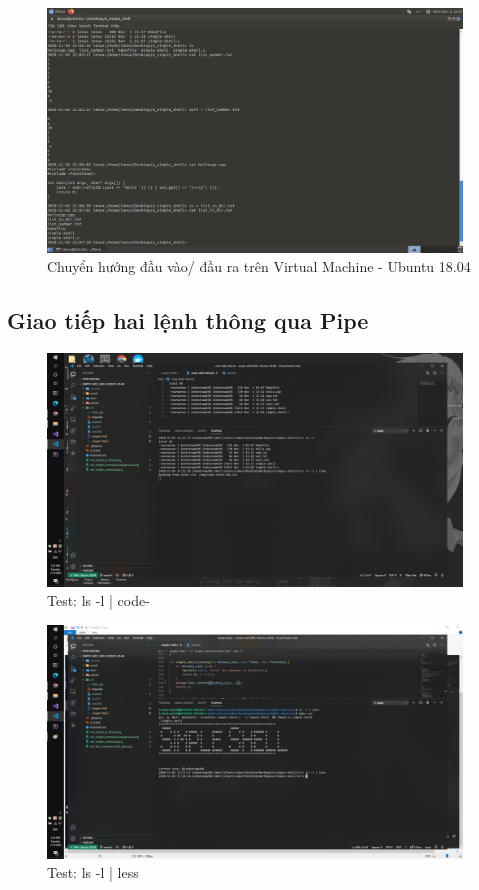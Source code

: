 \documentclass{article}
\begin{document}
\begin{figure}[H]
\centering
\includegraphics[width=0.98\textwidth]{virtual_machine_redirect_io.png}
\caption{Chuyển hướng đầu vào/ đầu ra trên Virtual Machine - Ubuntu 18.04}
\end{figure}

\subsection{Giao tiếp hai lệnh thông qua Pipe}

\begin{figure}[H]
\centering
\includegraphics[width=0.98\textwidth]{wsl_two_command_with_pipe.png}
\caption{Test: ls -l | code- }
\end{figure}


\begin{figure}[H]
\centering
\includegraphics[width=0.98\textwidth]{wsl_two_command_with_pipe_01.png}
\caption{Test: ls -l | less}
\end{figure}
\end{document}
